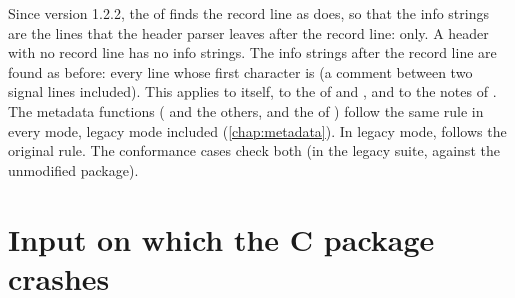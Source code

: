 Since version 1.2.2, the  of \wfdbx{} finds the record line as
 does, so that the info strings are the lines that the
header parser leaves after the record line:  only. A header
with no record line has no info strings. The info strings after the record
line are found as before: every line whose first character is \code{\#} (a
comment between two signal lines included). This applies to 
itself, to the  of  and
, and to the notes of . The metadata
functions ( and the others, and the  of
) follow the same rule in every mode, legacy mode
included (\cref{chap:metadata}). In legacy mode,  follows the
original rule. The conformance cases  check both (in
the legacy suite, against the unmodified package).

\section{Input on which the C package crashes}
\label{sec:crashes}

